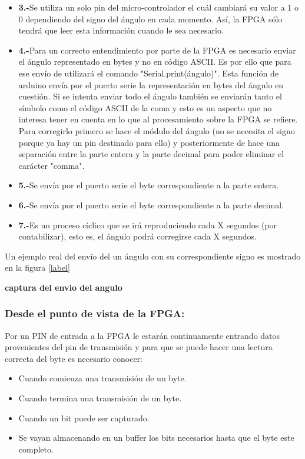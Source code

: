 \begin{itemize}
	
	\item \textbf{3.-}Se utiliza un solo pin del micro-controlador el cuál cambiará su valor a 1 o 0 dependiendo del signo del ángulo en cada momento. Así, la FPGA sólo tendrá que leer esta información cuando le sea necesario.
	\item \textbf{4.-}Para un correcto entendimiento por parte de la FPGA es necesario enviar el ángulo representado en bytes y no en código ASCII. Es por ello que para ese envío de utilizará el comando "Serial.print(ángulo)". Esta función de arduino envía por el puerto serie la representación en bytes del ángulo en cuestión.\newline
	Si se intenta enviar todo el ángulo también se enviarán tanto el símbolo como el código ASCII de la coma y esto es un aspecto que no interesa tener en cuenta en lo que al procesamiento sobre la FPGA se refiere. Para corregirlo primero se hace el módulo del ángulo (no se necesita el signo porque ya hay un pin destinado para ello) y posteriormente de hace una separación entre la parte entera y la parte decimal para poder eliminar el carácter "comma". 
	
	\item \textbf{5.-}Se envía por el puerto serie el byte correspondiente a la parte entera. 
	\item \textbf{6.-}Se envía por el puerto serie el byte correspondiente a la parte decimal. 
	\item \textbf{7.-}Es un proceso cíclico que se irá reproduciendo cada X segundos (por contabilizar), esto es, el ángulo podrá corregirse cada X segundos. 
\end{itemize}
Un ejemplo real del envío del un ángulo con su correspondiente signo es mostrado en la figura \ref{label}

\textbf{captura del envio del angulo}

\subsubsection{Desde el punto de vista de la FPGA:} \label{sec:vista_fpga}

Por un PIN de entrada a la FPGA le estarán continuamente entrando datos provenientes del pin de transmisión y para que se puede hacer una lectura correcta del byte es necesario conocer: 

\begin{itemize}
	\item Cuando comienza una transmisión de un byte.
	\item Cuando termina una transmisión de un byte.
	\item Cuando un bit puede ser capturado. 
	\item Se vayan almacenando en un buffer los bits necesarios hasta que el byte este completo.
\end{itemize}

